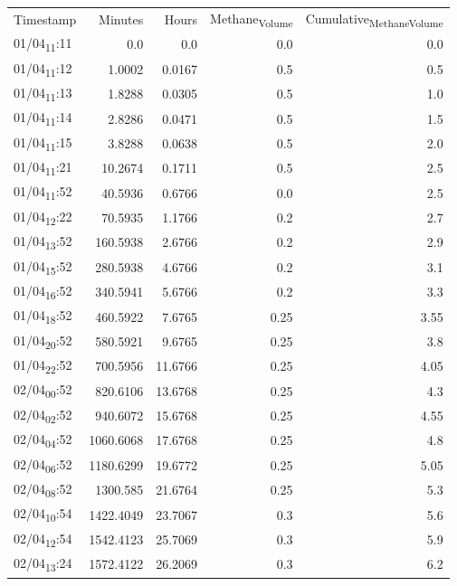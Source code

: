 \documentclass[11pt]{article}
\begin{document}
\begin{center}
\begin{tabular}{lrrrr}
Timestamp & Minutes & Hours & Methane\textsubscript{Volume} & Cumulative\textsubscript{Methane}\textsubscript{Volume}\\[0pt]
01/04\textsubscript{11}:11 & 0.0 & 0.0 & 0.0 & 0.0\\[0pt]
01/04\textsubscript{11}:12 & 1.0002 & 0.0167 & 0.5 & 0.5\\[0pt]
01/04\textsubscript{11}:13 & 1.8288 & 0.0305 & 0.5 & 1.0\\[0pt]
01/04\textsubscript{11}:14 & 2.8286 & 0.0471 & 0.5 & 1.5\\[0pt]
01/04\textsubscript{11}:15 & 3.8288 & 0.0638 & 0.5 & 2.0\\[0pt]
01/04\textsubscript{11}:21 & 10.2674 & 0.1711 & 0.5 & 2.5\\[0pt]
01/04\textsubscript{11}:52 & 40.5936 & 0.6766 & 0.0 & 2.5\\[0pt]
01/04\textsubscript{12}:22 & 70.5935 & 1.1766 & 0.2 & 2.7\\[0pt]
01/04\textsubscript{13}:52 & 160.5938 & 2.6766 & 0.2 & 2.9\\[0pt]
01/04\textsubscript{15}:52 & 280.5938 & 4.6766 & 0.2 & 3.1\\[0pt]
01/04\textsubscript{16}:52 & 340.5941 & 5.6766 & 0.2 & 3.3\\[0pt]
01/04\textsubscript{18}:52 & 460.5922 & 7.6765 & 0.25 & 3.55\\[0pt]
01/04\textsubscript{20}:52 & 580.5921 & 9.6765 & 0.25 & 3.8\\[0pt]
01/04\textsubscript{22}:52 & 700.5956 & 11.6766 & 0.25 & 4.05\\[0pt]
02/04\textsubscript{00}:52 & 820.6106 & 13.6768 & 0.25 & 4.3\\[0pt]
02/04\textsubscript{02}:52 & 940.6072 & 15.6768 & 0.25 & 4.55\\[0pt]
02/04\textsubscript{04}:52 & 1060.6068 & 17.6768 & 0.25 & 4.8\\[0pt]
02/04\textsubscript{06}:52 & 1180.6299 & 19.6772 & 0.25 & 5.05\\[0pt]
02/04\textsubscript{08}:52 & 1300.585 & 21.6764 & 0.25 & 5.3\\[0pt]
02/04\textsubscript{10}:54 & 1422.4049 & 23.7067 & 0.3 & 5.6\\[0pt]
02/04\textsubscript{12}:54 & 1542.4123 & 25.7069 & 0.3 & 5.9\\[0pt]
02/04\textsubscript{13}:24 & 1572.4122 & 26.2069 & 0.3 & 6.2\\[0pt]

\end{tabular}
\end{center}
\end{document}
